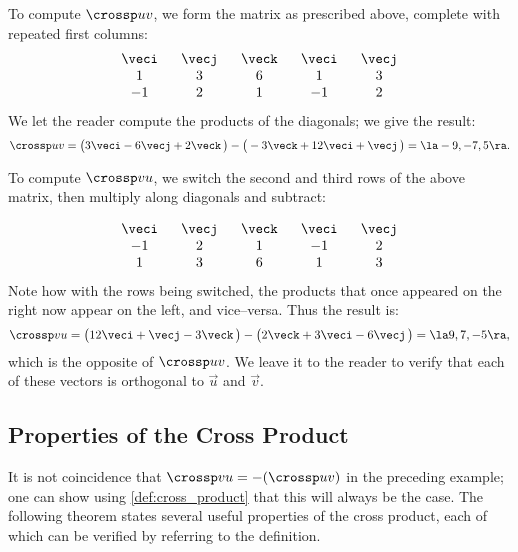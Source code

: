 {To compute $\crossp uv$, we form the matrix as prescribed above, complete with repeated first columns:
$$\begin{array}{ccccc} \ \veci\ &\ \vecj\ &\ \veck\ &\ \veci\ &\ \vecj\ \\  1&3&6&1&3\\-1&2&1&-1&2\end{array}$$
We let the reader compute the products of the diagonals; we give the result:
$$\crossp uv = \big(3\veci-6\vecj+2\veck\,\big) - \big(-3\veck + 12\veci+\vecj\,\big) = \la -9,-7,5\ra.$$

To compute $\crossp vu$, we switch the second and third rows of the above matrix, then multiply along diagonals and subtract:

$$\begin{array}{ccccc} \ \veci\ &\ \vecj\ &\ \veck\ &\ \veci\ &\ \vecj\ \\-1&2&1&-1&2\\  1&3&6&1&3\end{array}$$
Note how with the rows being switched, the products that once appeared on the right now appear on the left, and vice--versa. Thus the result is:
$$\crossp vu = \big(12\veci+\vecj-3\veck\,\big) - \big(2\veck + 3\veci-6\vecj\,\big) = \la 9,7,-5\ra,$$
which is the opposite of $\crossp uv$. We leave it to the reader to verify that each of these vectors is orthogonal to $\vec u$ and $\vec v$.}

\subsection*{Properties of the Cross Product}

It is not coincidence that $\crossp vu = -(\crossp uv)$ in the preceding example; one can show using \autoref{def:cross_product} that this will always be the case. The following theorem states several useful properties of the cross product, each of which can be verified by referring to the definition.

